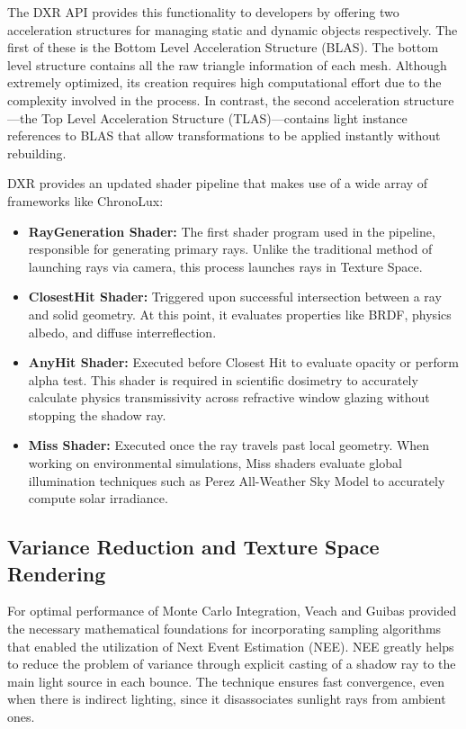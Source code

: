 The DXR API provides this functionality to developers by offering two acceleration structures for managing static and dynamic objects respectively. The first of these is the Bottom Level Acceleration Structure (BLAS). The bottom level structure contains all the raw triangle information of each mesh. Although extremely optimized, its creation requires high computational effort due to the complexity involved in the process. In contrast, the second acceleration structure—the Top Level Acceleration Structure (TLAS)—contains light instance references to BLAS that allow transformations to be applied instantly without rebuilding.

DXR provides an updated shader pipeline that makes use of a wide array of frameworks like ChronoLux:
\begin{itemize}
    \item \textbf{RayGeneration Shader:} The first shader program used in the pipeline, responsible for generating primary rays. Unlike the traditional method of launching rays via camera, this process launches rays in Texture Space.
    \item \textbf{ClosestHit Shader:} Triggered upon successful intersection between a ray and solid geometry. At this point, it evaluates properties like BRDF, physics albedo, and diffuse interreflection.
    \item \textbf{AnyHit Shader:} Executed before Closest Hit to evaluate opacity or perform alpha test. This shader is required in scientific dosimetry to accurately calculate physics transmissivity across refractive window glazing without stopping the shadow ray.
    \item \textbf{Miss Shader:} Executed once the ray travels past local geometry. When working on environmental simulations, Miss shaders evaluate global illumination techniques such as Perez All-Weather Sky Model \cite{perez1993all} to accurately compute solar irradiance.
\end{itemize}

\subsection{Variance Reduction and Texture Space Rendering}
For optimal performance of Monte Carlo Integration, Veach and Guibas \cite{veach1995optimally} provided the necessary mathematical foundations for incorporating sampling algorithms that enabled the utilization of Next Event Estimation (NEE). NEE greatly helps to reduce the problem of variance through explicit casting of a shadow ray to the main light source in each bounce. The technique ensures fast convergence, even when there is indirect lighting, since it disassociates sunlight rays from ambient ones.

